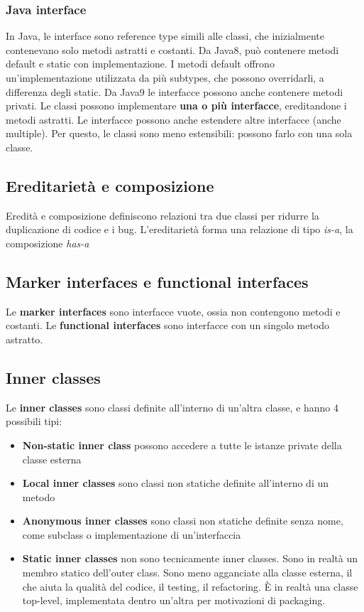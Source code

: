 \documentclass[11pt]{article}
\begin{document}
\subsubsection{Java interface}
In Java, le interface sono reference type simili alle classi, che inizialmente contenevano solo metodi astratti e costanti. Da Java8, può contenere metodi default e static con implementazione. I metodi default offrono un'implementazione utilizzata da più subtypes, che possono overridarli, a differenza degli static. Da Java9 le interfacce possono anche contenere metodi privati. Le classi possono implementare \textbf{una o più interfacce}, ereditandone i metodi astratti. Le interfacce possono anche estendere altre interfacce (anche multiple). Per questo, le classi sono meno estensibili: possono farlo con una sola classe.
\subsection{Ereditarietà e composizione}
Eredità e composizione definiscono relazioni tra due classi per ridurre la duplicazione di codice e i bug. L'ereditarietà forma una relazione di tipo \textit{is-a}, la composizione \textit{has-a}
\subsection{Marker interfaces e functional interfaces}\label{funcint}
Le \textbf{marker interfaces} sono interfacce vuote, ossia non contengono metodi e costanti. Le \textbf{functional interfaces} sono interfacce con un singolo metodo astratto.
\subsection{Inner classes}
Le \textbf{inner classes} sono classi definite all'interno di un'altra classe, e hanno 4 possibili tipi:
\begin{itemize}
    \item \textbf{Non-static inner class} possono accedere a tutte le istanze private della classe esterna
    \item \textbf{Local inner classes} sono classi non statiche definite all'interno di un metodo
    \item \textbf{Anonymous inner classes} sono classi non statiche definite senza nome, come subclass o implementazione di un'interfaccia
    \item \textbf{Static inner classes} non sono tecnicamente inner classes. Sono in realtà un membro statico dell'outer class. Sono meno agganciate alla classe esterna, il che aiuta la qualità del codice, il testing, il refactoring. È in realtà una classe top-level, implementata dentro un'altra per motivazioni di packaging.
\end{itemize}
\end{document}
